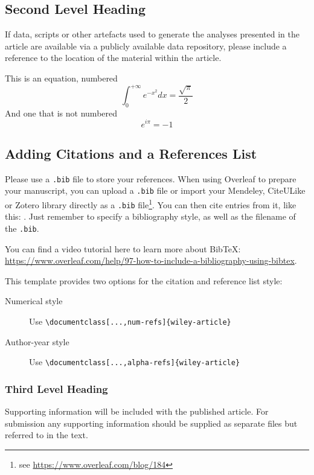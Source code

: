 \documentclass[alpha-refs]{wiley-article}
\begin{document}
\subsection{Second Level Heading}
If data, scripts or other artefacts used to generate the analyses presented in the article are available via a publicly available data repository, please include a reference to the location of the material within the article.

This is an equation, numbered
\begin{equation}
\int_0^{+\infty}e^{-x^2}dx=\frac{\sqrt{\pi}}{2}
\end{equation}
And one that is not numbered
\begin{equation*}
e^{i\pi}=-1
\end{equation*}

\subsection{Adding Citations and a References List}

Please use a \verb|.bib| file to store your references. When using Overleaf to prepare your manuscript, you can upload a \verb|.bib| file or import your Mendeley, CiteULike or Zotero library directly as a \verb|.bib| file\footnote{see \url{https://www.overleaf.com/blog/184}}. You can then cite entries from it, like this: \cite{lees2010theoretical}. Just remember to specify a bibliography style, as well as the filename of the \verb|.bib|.

You can find a video tutorial here to learn more about BibTeX: \url{https://www.overleaf.com/help/97-how-to-include-a-bibliography-using-bibtex}.

This template provides two options for the citation and reference list style: 
\begin{description}
\item[Numerical style] Use \verb|\documentclass[...,num-refs]{wiley-article}|
\item[Author-year style] Use \verb|\documentclass[...,alpha-refs]{wiley-article}|
\end{description}

\subsubsection{Third Level Heading}
Supporting information will be included with the published article. For submission any supporting information should be supplied as separate files but referred to in the text.
\end{document}
